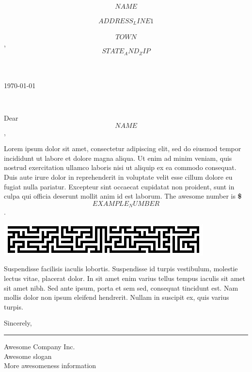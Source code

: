 \documentclass[11pt,letterpaper]{letter}
\def\ToNames{$$NAME$$}
\def\ToAddressLine1{$$ADDRESS_LINE1$$}
\def\ToTown{$$TOWN$$}
\def\ToStateAndZip{$$STATE_AND_ZIP$$}
\def\ExampleNumber{$$EXAMPLE_NUMBER$$ }
\def\opening#1{\thispagestyle{empty}
{\centering\fromaddress \vspace{0.6in} \\
\hspace{5.1in}\today\hspace*{\fill}\par}
{\raggedright \toname \\ \toaddress \par}
\vspace{0.4in}
\noindent #1 %
}
\begin{document}
\begin{letter}
{\ToNames\\
\ToAddressLine1\\
\ToTown, \ToStateAndZip\\
}

\opening{Dear \ToNames,}

Lorem ipsum dolor sit amet, consectetur adipiscing elit, sed do eiusmod tempor
incididunt ut labore et dolore magna aliqua. Ut enim ad minim veniam, quis 
nostrud exercitation ullamco laboris nisi ut aliquip ex ea commodo consequat. 
Duis aute irure dolor in reprehenderit in voluptate velit esse cillum dolore eu 
fugiat nulla pariatur. Excepteur sint occaecat cupidatat non proident, sunt in 
culpa qui officia deserunt mollit anim id est laborum. The awesome number is
\textbf{\$\ExampleNumber}.

\begin{center}
\includegraphics[scale=0.75]{Picture.jpg}
\par\end{center}

Suspendisse facilisis iaculis lobortis. Suspendisse id turpis vestibulum, 
molestie lectus vitae, placerat dolor. In sit amet enim varius tellus tempus 
iaculis sit amet sit amet nibh. Sed ante ipsum, porta et sem sed, consequat 
tincidunt est. Nam mollis dolor non ipsum eleifend hendrerit. Nullam in suscipit 
ex, quis varius turpis.

\closing{Sincerely,}

\vspace{.5in}\hrule
\begin{center}
{\footnotesize{}Awesome Company Inc.}\\
{\footnotesize{}Awesome slogan}\\
{\footnotesize{}More awesomeness information}\\
\par\end{center}{\footnotesize \par}

\end{letter}
\end{document}
